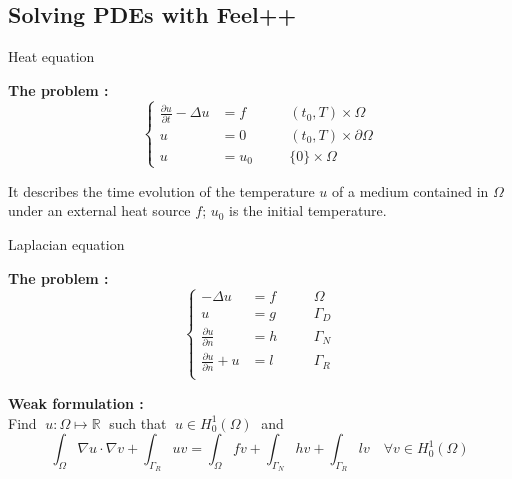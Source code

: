 \subsection{Solving PDEs with Feel++}

\begin{frame}{Heat equation}
	
	\textbf{The problem :}
	$$\left\{\begin{aligned}
		\frac{\partial u}{\partial t}-\Delta u &= f \quad&&(t_0,T)\times\Omega \\
		u&=0 \quad&&(t_0,T)\times\partial\Omega\\
		u&=u_0 \quad &&\{0\}\times\Omega
	\end{aligned}\right.$$

	It describes the time evolution of the temperature $u$ of a medium contained in $\Omega$ under an external heat source $f$; $u_0$ is the initial temperature.
	
\end{frame}

\begin{frame}{Laplacian equation}
	
	\textbf{The problem :}
	$$\left\{\begin{aligned}
		-\Delta u &= f \quad&&\Omega \\
		u&=g \quad&&\Gamma_D \\
		\frac{\partial u}{\partial n} &=h \quad &&\Gamma_N \\
		\frac{\partial u}{\partial n}+u &=l \quad &&\Gamma_R \\
	\end{aligned}\right.$$
	
	\textbf{Weak formulation :} \\
	Find $\; u:\Omega \mapsto \mathbb{R} \;$ such that $\; u\in H_0^1(\Omega) \;$ and
	$$\int_\Omega \nabla u \cdot \nabla v + \int_{\Gamma_R}uv = \int_\Omega fv + \int_{\Gamma_N}hv+\int_{\Gamma_R}lv \quad \forall v\in H_0^1(\Omega)$$
	
\end{frame}

